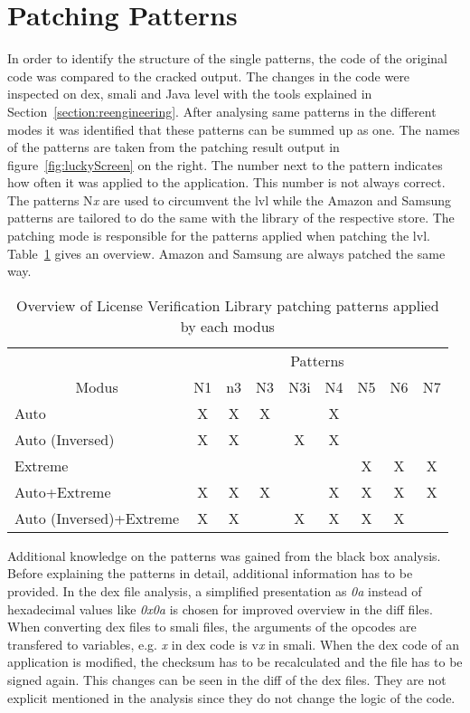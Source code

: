 \section{Patching Patterns} \label{section:luckypatcher-patterns}
In order to identify the structure of the single patterns, the code of the original code was compared to the cracked output.
The changes in the code were inspected on dex, smali and Java level with the tools explained in Section~\ref{section:reengineering}.
After analysing same patterns in the different modes it was identified that these patterns can be summed up as one.
\newline
The names of the patterns are taken from the patching result output in figure~\ref{fig:luckyScreen} on the right.
The number next to the pattern indicates how often it was applied to the application.
This number is not always correct.
The patterns N\textit{x} are used to circumvent the \gls{lvl} while the Amazon and Samsung patterns are tailored to do the same with the library of the respective store.
The patching mode is responsible for the patterns applied when patching the \gls{lvl}.
Table~\ref{table:patterns} gives an overview.
Amazon and Samsung are always patched the same way.
\begin{table}[h]
\centering
\begin{tabular}{l|cccccccc}
                           & \multicolumn{8}{c}{Patterns}           \\
\multicolumn{1}{c|}{Modus} & N1 & n3 & N3 & N3i & N4 & N5 & N6 & N7 \\ \hline
Auto                       & X  & X  & X  &     & X  &    &    &    \\
Auto (Inversed)            & X  & X  &    & X   & X  &    &    &    \\
Extreme                    &    &    &    &     &    & X  & X  & X  \\
Auto+Extreme               & X  & X  & X  &     & X  & X  & X  & X  \\
Auto (Inversed)+Extreme    & X  & X  &    & X   & X  & X  & X  &
\end{tabular}
\caption{Overview of License Verification Library patching patterns applied by each modus}
\label{table:patterns}
\end{table}
Additional knowledge on the patterns was gained from the black box analysis.
\newline
\newline
Before explaining the patterns in detail, additional information has to be provided.
In the \gls{dex} file analysis, a simplified presentation as \textit{0a} instead of hexadecimal values like \textit{0x0a} is chosen for improved overview in the diff files.
When converting \gls{dex} files to smali files, the arguments of the opcodes are transfered to variables, e.g. \textit{x} in dex code is v\textit{x} in smali.
\newline
\newline
When the dex code of an application is modified, the checksum has to be recalculated and the file has to be signed again.
This changes can be seen in the diff of the dex files.
They are not explicit mentioned in the analysis since they do not change the logic of the code.

